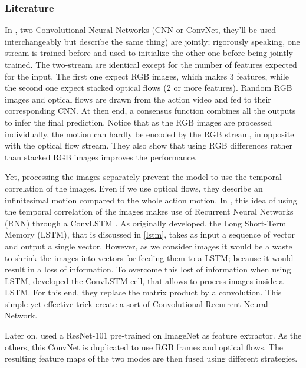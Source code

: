 \documentclass[12pt, a4paper]{report}
\begin{document}
				\subsubsection{Literature}\label{literature}
					In \cite{wang2016temporal}, two Convolutional Neural Networks (CNN or ConvNet, they'll be used interchangeably but describe the same thing) are \gls{jointly}; rigorously speaking, one stream is trained before and used to initialize the other one before being jointly trained.
					The two-stream are identical except for the number of features expected for the input.
					The first one expect RGB images, which makes 3 features, while the second one expect stacked optical flows (2 or more features).
					Random RGB images and optical flows are drawn from the action video and fed to their corresponding CNN.
					At then end, a consensus function combines all the outputs to infer the final prediction.
					Notice that as the RGB images are processed individually, the motion can hardly be encoded by the RGB stream, in opposite with the optical flow stream.
					They also show that using RGB differences rather than stacked RGB images improves the performance.
					\par
					Yet, processing the images separately prevent the model to use the temporal correlation of the images.
					Even if we use optical flows, they describe an infinitesimal motion compared to the whole action motion.
					In \cite{ye2019two}, this idea of using the temporal correlation of the images makes use of Recurrent Neural Networks (RNN) through a ConvLSTM \cite{shi2015convolutional}.
					As originally developed, the Long Short-Term Memory (LSTM), that is discussed in \ref{lstm}, takes as input a sequence of vector and output a single vector.
					However, as we consider images it would be a waste to shrink the images into vectors for feeding them to a LSTM; because it would result in a loss of information.
					To overcome this lost of information when using LSTM, \cite{shi2015convolutional} developed the ConvLSTM cell, that allows to process images inside a LSTM.
					For this end, they replace the matrix product by a convolution.
					This simple yet effective trick create a sort of Convolutional Recurrent Neural Network.
					\par
					Later on, \cite{ye2019two} used a ResNet-101 pre-trained on ImageNet as feature extractor.
					As the others, this ConvNet is duplicated to use RGB frames and optical flows.
					The resulting feature maps of the two modes are then fused using different strategies.
\end{document}
